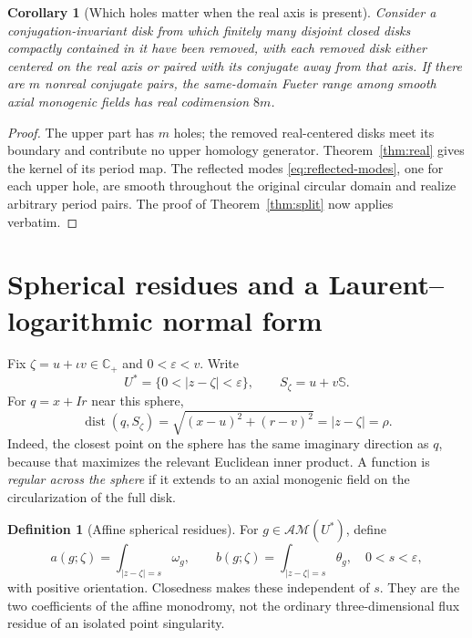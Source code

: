 \documentclass[11pt,a4paper]{article}
\numberwithin{equation}{section}
\newtheorem{corollary}[theorem]{Corollary}
\theoremstyle{definition}
\newtheorem{definition}[theorem]{Definition}
\theoremstyle{remark}
\newcommand{\C}{\mathbb C}
\newcommand{\Sp}{\mathbb S}
\newcommand{\Cp}{\C_+}
\newcommand{\AM}{\mathcal{AM}}
\begin{document}
\begin{corollary}[Which holes matter when the real axis is present]
\label{cor:real-holes}
Consider a conjugation-invariant disk from which finitely many disjoint
closed disks compactly contained in it have been removed, with each removed disk either centered
on the real axis or paired with its conjugate away from that axis.
If there are $m$ nonreal conjugate pairs, the same-domain Fueter range
among smooth axial monogenic fields has real codimension $8m$.
\end{corollary}
\begin{proof}
The upper part has $m$ holes; the removed real-centered disks meet its
boundary and contribute no upper homology generator. Theorem~\ref{thm:real}
gives the kernel of its period map. The reflected modes
\eqref{eq:reflected-modes}, one for each upper hole, are smooth throughout
the original circular domain and realize arbitrary period pairs.
The proof of Theorem~\ref{thm:split} now applies verbatim.
\end{proof}

\section{Spherical residues and a Laurent--logarithmic normal form}
\label{sec:singularities}

Fix $\zeta=u+\iota v\in\Cp$ and $0<\varepsilon<v$. Write
\[
 U^*=\{0<|z-\zeta|<\varepsilon\},\qquad S_\zeta=u+v\Sp.
\]
For $q=x+Ir$ near this sphere,
\begin{equation}\label{eq:distance-sphere}
 \operatorname{dist}(q,S_\zeta)
 =\sqrt{(x-u)^2+(r-v)^2}=|z-\zeta|=\rho.
\end{equation}
Indeed, the closest point on the sphere has the same imaginary direction
as $q$, because that maximizes the relevant Euclidean inner product.
A function is \emph{regular across the sphere} if it extends to an axial
monogenic field on the circularization of the full disk.

\begin{definition}[Affine spherical residues]\label{def:residues}
For $g\in\AM(U^*)$, define
\begin{equation}\label{eq:res-pair}
 a(g;\zeta)=\int_{|z-\zeta|=s}\omega_g,\qquad
 b(g;\zeta)=\int_{|z-\zeta|=s}\theta_g,
 \quad 0<s<\varepsilon,
\end{equation}
with positive orientation. Closedness makes these independent of $s$.
They are the two coefficients of the affine monodromy, not the ordinary
three-dimensional flux residue of an isolated point singularity.
\end{definition}
\end{document}
